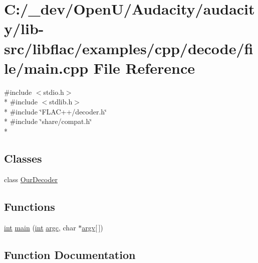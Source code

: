 \hypertarget{lib-src_2libflac_2examples_2cpp_2decode_2file_2main_8cpp}{}\section{C\+:/\+\_\+dev/\+Open\+U/\+Audacity/audacity/lib-\/src/libflac/examples/cpp/decode/file/main.cpp File Reference}
\label{lib-src_2libflac_2examples_2cpp_2decode_2file_2main_8cpp}
{\ttfamily \#include $<$stdio.\+h$>$}\\*
{\ttfamily \#include $<$stdlib.\+h$>$}\\*
{\ttfamily \#include \char`\"{}F\+L\+A\+C++/decoder.\+h\char`\"{}}\\*
{\ttfamily \#include \char`\"{}share/compat.\+h\char`\"{}}\\*
\subsection*{Classes}
\begin{DoxyCompactItemize}
\item 
class \hyperlink{class_our_decoder}{Our\+Decoder}
\end{DoxyCompactItemize}
\subsection*{Functions}
\begin{DoxyCompactItemize}
\item 
\hyperlink{xmltok_8h_a5a0d4a5641ce434f1d23533f2b2e6653}{int} \hyperlink{lib-src_2libflac_2examples_2cpp_2decode_2file_2main_8cpp_a0ddf1224851353fc92bfbff6f499fa97}{main} (\hyperlink{xmltok_8h_a5a0d4a5641ce434f1d23533f2b2e6653}{int} \hyperlink{cmdline_8c_aaffeb1bf2056ea44af5b5d0ee4d6ff07}{argc}, char $\ast$\hyperlink{cmdline_8c_ad407d5ba91709bd9b092003858600723}{argv}\mbox{[}$\,$\mbox{]})
\end{DoxyCompactItemize}


\subsection{Function Documentation}
